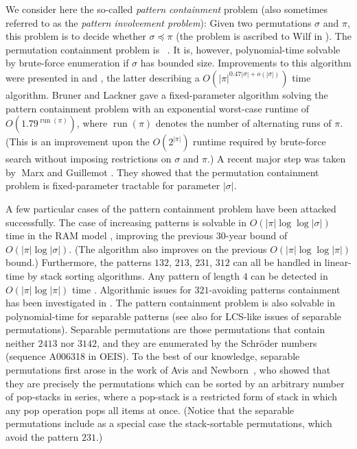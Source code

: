 \documentclass[a4paper]{llncs}
\DeclareMathOperator{\RUN}{run}
\newcounter{num}
\begin{document}
	We consider here the so-called \emph{pattern containment} problem
	(also sometimes referred to as the \emph{pattern involvement problem}):
	Given two permutations $\sigma$ and $\pi$, this problem is to decide whether
	$\sigma \preceq \pi$ (the problem is ascribed to Wilf in \cite{Bose:Buss:Lubiw:1998}).
	The permutation containment problem is \NPhard~\cite{Bose:Buss:Lubiw:1998}.
	It is, however, polynomial-time solvable by brute-force enumeration
	if $\sigma$ has bounded size.
	Improvements to this algorithm were presented in
	\cite{Albert:Aldred:Atkinson:Holton:ISAAC:2001} and
	\cite{Ahal:Rabinovich:2008},
	the latter describing a $O(|\pi|^{0.47|\sigma|+o(|\sigma|)})$ time algorithm.
	Bruner and Lackner \cite{Bruner:Lackner:SWAT:2012}
	gave a fixed-parameter algorithm solving the pattern containment problem with
	an exponential worst-case runtime of $O(1.79^{\RUN(\pi)})$,
	where $\RUN(\pi)$ denotes the number of alternating runs of $\pi$.
	(This is an improvement upon the $O(2^{|\pi|})$ runtime required by
	brute-force search without imposing restrictions on $\sigma$ and $\pi$.)
	A recent major step was taken by􏰂 Marx and Guillemot
	\cite{Guillemot:Marx:SODA:2014}.
	They showed that
	the permutation containment problem is fixed-parameter tractable for
	parameter $|\sigma|$.

	A few particular cases of the pattern containment problem have been attacked successfully.
	The case of increasing patterns is solvable in
	$O(|\pi| \log \log |\sigma|)$ time in the RAM model \cite{Crochemore:Porat:2010},
	improving the previous 30-year bound of $O(|\pi| \log |\sigma|)$.
	(The algorithm also improves on the previous
	$O(|\pi| \log \log |\pi|)$ bound.)
	Furthermore, the patterns $132$, $213$, $231$, $312$ can all be handled in linear-time
	by stack sorting algorithms.
	Any pattern of length $4$ can be detected in $O(|\pi| \log |\pi|)$ time
	\cite{Albert:Aldred:Atkinson:Holton:ISAAC:2001}.
	Algorithmic issues for $321$-avoiding patterns containment has been investigated in
	\cite{Guillemot:Vialette:ISAAC:2009}.
	The pattern containment problem is also solvable in
	polynomial-time for separable patterns \cite{Ibarra:1997,Bose:Buss:Lubiw:1998}
	(see also \cite{Bouvel:Rossin:Vialette:CPM:2007} for LCS-like issues
	of separable permutations).
	Separable permutations are those permutations that contain neither
	$2413$ nor $3142$, and they are enumerated by the Schr{\"o}der numbers
	(sequence A006318 in OEIS).
	To the best of our knowledge,
	separable permutations first arose in the work of
	Avis and Newborn~\cite{Avis:Newborn:1981},
	who showed that they are precisely the permutations which can be sorted by an
	arbitrary number of pop-stacks in series,
	where a pop-stack is a restricted form of stack in which any pop operation
	pops all items at once.
	(Notice that the separable permutations include as a special case the
	stack-sortable permutations, which avoid the pattern $231$.)
\end{document}
